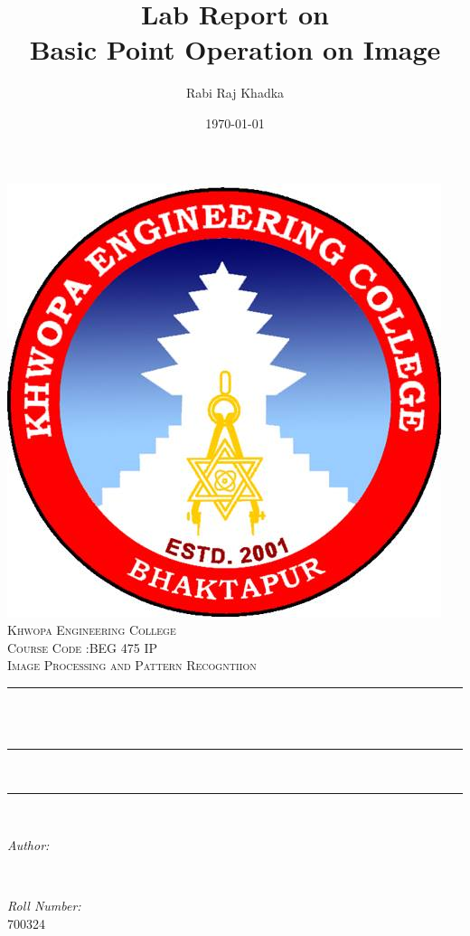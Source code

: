 \documentclass[12pt]{article}
\title{Lab Report on\\ Basic Point Operation on Image }								%
\author{Rabi Raj Khadka }								%
\date{\today}											%
\makeatletter
\let\thetitle\@title
\let\theauthor\@author
\let\thedate\@date
\makeatother
\begin{document}

\begin{titlepage}
	\centering
    \vspace*{0.2 cm}
    \includegraphics[scale = 0.3]{kheclogo.jpg}\\[1.0 cm]	%
    \textsc{\LARGE Khwopa Engineering College}\\[2.0 cm]	%
	\textsc{\Large Course Code :BEG 475 IP}\\[0.5 cm]				%
	\textsc{\large Image Processing and Pattern Recogntiion}\\[0.5 cm]				%
	\rule{\linewidth}{0.2 mm} \\[0.4 cm]
	{ \huge \bfseries \thetitle}\\
	\rule{\linewidth}{0.2 mm} \\[1.0 cm]
	
	\rule{\linewidth}{0 mm} \\[1.0 cm]

	\begin{minipage}{0.4\textwidth}
		\begin{flushleft} \large
			\emph{Author:}\\
			\theauthor
			\end{flushleft}
			\end{minipage}~
			\begin{minipage}{0.4\textwidth}
			\begin{flushright} \large
			\emph{Roll  Number:} \\
			700324									%
		\end{flushright}
	\end{minipage}\\[2 cm]
	
	{\large \thedate}\\[2 cm]
 
	\vfill
	
\end{titlepage}
\end{document}

